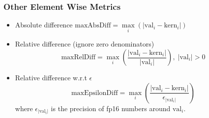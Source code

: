 \documentclass[t, pdftex, aspectratio=169]{beamer}  %
\begin{document}
\begin{frame}
  \frametitle{Other Element Wise Metrics}

  \begin{itemize}
  \item Absolute difference $\text{maxAbsDiff} = \max\limits_i(|\text{val}_i - \text{kern}_i|)$
  \item Relative difference (ignore zero denominators)
    \begin{equation}
      \text{maxRelDiff} = \max\limits_i(\frac{|\text{val}_i - \text{kern}_i|}{|\text{val}_i|}), \; |\text{val}_i|>0\nonumber
    \end{equation}
  \item Relative difference w.r.t $\epsilon$
    \begin{equation}
      \text{maxEpsilonDiff} = \max\limits_i(\frac{|\text{val}_i - \text{kern}_i|}{\epsilon_{|\text{val}_i|}})\nonumber
    \end{equation}
    where $\epsilon_{|\text{val}_i|}$ is the precision of fp16 numbers around $\text{val}_i$.
  \end{itemize}
  
\end{frame}
\end{document}
